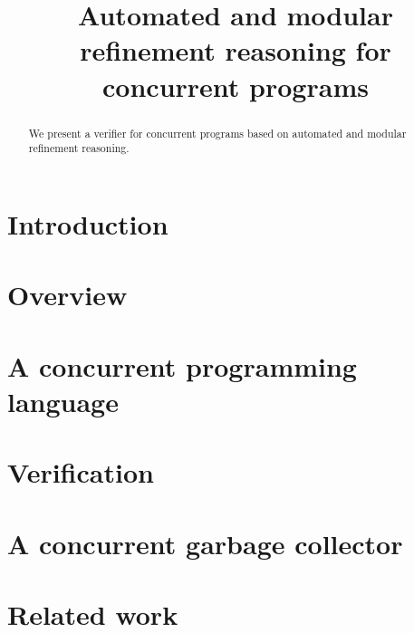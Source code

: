 \documentclass [preprint]{sigplanconf}
\theoremstyle{remark}
\theoremstyle{definition}
\newcommand{\civl}{{\sc civl}\xspace}
\newcommand{\boogie}{{\sc boogie}\xspace}
\newcommand{\zthree}{{\sc Z3}\xspace}
\newcommand{\casm}{{\sc casm}\xspace}
\begin{document}
\setlength{\pdfpageheight}{\paperheight}
\setlength{\pdfpagewidth}{\paperwidth}


\title{Automated and modular refinement reasoning for concurrent programs}
\authorinfo{}{}{}

\maketitle



\begin{abstract}
We present a verifier for concurrent programs based on automated and modular refinement reasoning.  

\end{abstract}

\section{Introduction}
\label{sec:introduction}

\section{Overview}
\label{sec:overview}

\section{A concurrent programming language}
\label{sec:language}

\section{Verification}
\label{sec:verification}

\section{A concurrent garbage collector}
\label{sec:gc}


\section{Related work}
\label{sec:related}





\appendix

\end{document}
